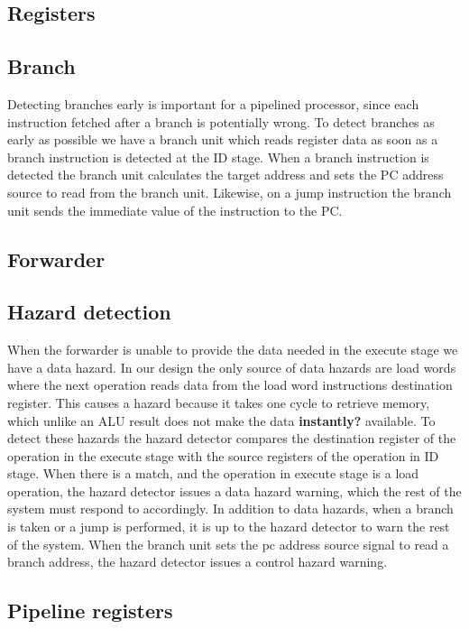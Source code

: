 \subsection{Registers}

\subsection{Branch}
Detecting branches early is important for a pipelined processor, since each instruction fetched after a branch is potentially wrong.
To detect branches as early as possible we have a branch unit which reads register data as soon as a branch instruction is detected at the ID stage.
When a branch instruction is detected the branch unit calculates the target address and sets the PC address source to read from the branch unit.
Likewise, on a jump instruction the branch unit sends the immediate value of the instruction to the PC.

\subsection{Forwarder}
\label{section:Forwarder}

\subsection{Hazard detection}
When the forwarder is unable to provide the data needed in the execute stage we have a data hazard. In our design the only source of data hazards are load words where the next operation reads data from the load word instructions destination register. 
This causes a hazard because it takes one cycle to retrieve memory, which unlike an ALU result does not make the data \textbf{instantly?} available. 
To detect these hazards the hazard detector compares the destination register of the operation in the execute stage with the source registers of the operation in ID stage.
When there is a match, and the operation in execute stage is a load operation, the hazard detector issues a data hazard warning, which the rest of the system must respond to accordingly.
In addition to data hazards, when a branch is taken or a jump is performed, it is up to the hazard detector to warn the rest of the system.
When the branch unit sets the pc address source signal to read a branch address, the hazard detector issues a control hazard warning.

\subsection{Pipeline registers}
